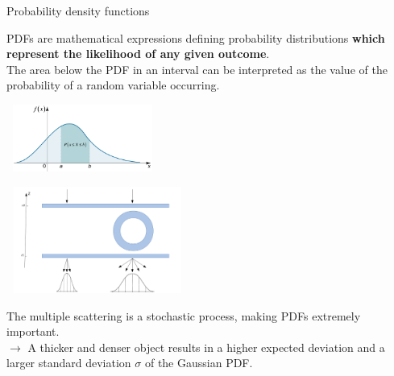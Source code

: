 \documentclass[8 pt]{beamer}
\begin{document}
\begin{frame}{Probability density functions}

\begin{minipage}[c]{.50\textwidth}
\justifying
PDFs are mathematical expressions defining probability distributions \textbf{which represent the likelihood of any given outcome}. \\ \vspace{10pt}
The area below the PDF in an interval can be interpreted as the value of the probability of a random variable occurring. 
\end{minipage}
\begin{minipage}[c]{.50\textwidth}
\begin{center}
\includegraphics[width=5cm, height=2.2cm]{figs/PDF.png}
\end{center}
\end{minipage} \vfill

\begin{minipage}[c]{.50\textwidth}
\includegraphics[width=6cm, height=3.5cm]{figs/pdfs.png}
\end{minipage}
\begin{minipage}[c]{.50\textwidth}
\justifying
The multiple scattering is a stochastic process, making PDFs extremely important. \\ \vspace{2pt} \hspace{10pt} $\rightarrow$ A thicker and denser object results in a higher expected deviation and a larger standard deviation $\sigma$ of the Gaussian PDF.

\end{minipage}
\end{frame}
\end{document}
